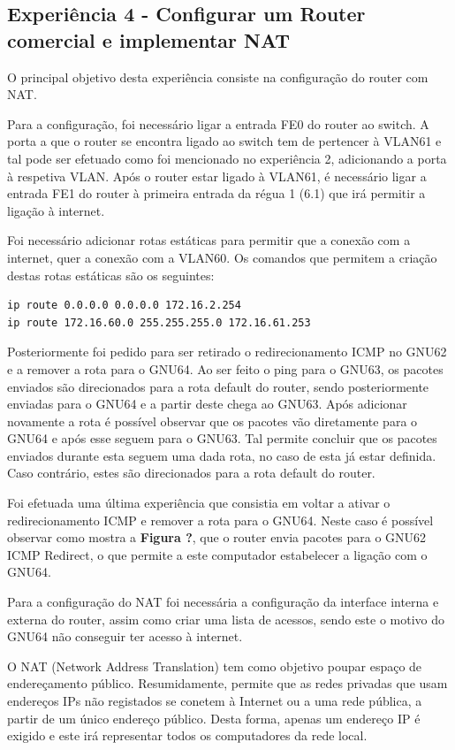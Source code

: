 \documentclass[article, a4paper, 11pt, oneside]{memoir}
\begin{document}
\subsection{Experiência 4 - Configurar um Router comercial e implementar NAT}

O principal objetivo desta experiência consiste na configuração do router com NAT.

Para a configuração, foi necessário ligar a entrada FE0 do router ao switch.
A porta a que o router se encontra ligado ao switch tem de pertencer à VLAN61 e tal pode ser efetuado como foi
mencionado no experiência 2, adicionando a porta à respetiva VLAN. Após o router estar ligado à VLAN61, 
é necessário ligar a entrada FE1 do router à primeira entrada da régua 1 (6.1) que irá permitir a ligação à internet.

Foi necessário adicionar rotas estáticas para permitir que a conexão com a internet, quer a conexão com a VLAN60.
Os comandos que permitem a criação destas rotas estáticas são os seguintes:

\begin{lstlisting} 
ip route 0.0.0.0 0.0.0.0 172.16.2.254
ip route 172.16.60.0 255.255.255.0 172.16.61.253
\end{lstlisting} 

Posteriormente foi pedido para ser retirado o redirecionamento ICMP no GNU62 e a remover a rota para o GNU64.
Ao ser feito o ping para o GNU63, os pacotes enviados são direcionados para a rota default do router, sendo posteriormente enviadas para o GNU64 e a partir deste
chega ao GNU63. Após adicionar novamente a rota é possível observar que os pacotes vão diretamente para o GNU64 e após esse seguem para o GNU63. Tal
permite concluir que os pacotes enviados durante esta seguem uma dada rota, no caso de esta já estar definida.
Caso contrário, estes são direcionados para a rota default do router.

Foi efetuada uma última experiência que consistia em voltar a ativar o redirecionamento ICMP e remover a rota para o GNU64. Neste caso é possível observar como
mostra a \textbf{Figura ?}, que o router envia pacotes para o GNU62 ICMP Redirect, o que permite a este computador estabelecer a ligação com o GNU64.

Para a configuração do NAT foi necessária a configuração da interface interna e externa do router, assim como criar uma lista de acessos, sendo este o motivo
do GNU64 não conseguir ter acesso à internet.

O NAT (Network Address Translation) tem como objetivo poupar espaço de endereçamento público.
Resumidamente, permite que as redes privadas que usam endereços IPs não registados se conetem à Internet ou a uma rede pública,
a partir de um único endereço público. 
Desta forma, apenas um endereço IP é exigido e este irá representar todos os computadores da rede local.
 
\end{document}
